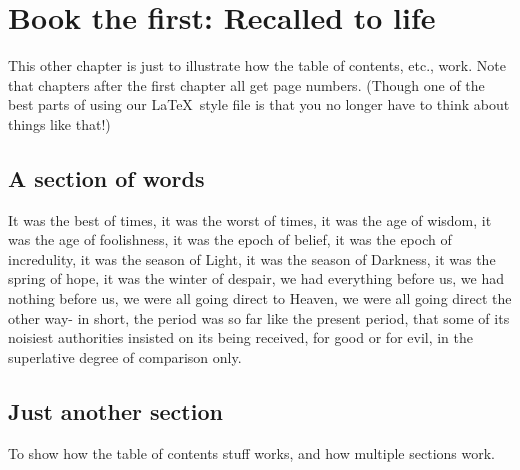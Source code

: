 \documentclass[modernstyle,12pt]{sjsuthesis}
\theoremstyle{definition}
\begin{document}
\chapter{Book the first: Recalled to life}

This other chapter is just to illustrate how the table of contents,
etc., work.  Note that chapters after the first chapter all get page
numbers.  (Though one of the best parts of using our \LaTeX\ style
file is that you no longer have to think about things like that!)

\section{A section of words}

It was the best of times, it was the worst of times, it was the age of
wisdom, it was the age of foolishness, it was the epoch of belief, it
was the epoch of incredulity, it was the season of Light, it was the
season of Darkness, it was the spring of hope, it was the winter of
despair, we had everything before us, we had nothing before us, we
were all going direct to Heaven, we were all going direct the other
way- in short, the period was so far like the present period, that
some of its noisiest authorities insisted on its being received, for
good or for evil, in the superlative degree of comparison only.

\section{Just another section}

To show how the table of contents stuff works, and how multiple
sections work.



%
%
%





\end{document}
